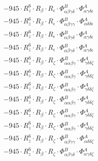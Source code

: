 \documentclass{article}
\begin{document}
\begin{subequations}
\begin{gather}
\begin{array}{c}
 \\[0.2em] 		 - 945 \cdot R_{z}^{6} \cdot R_{\beta{}} \cdot R_{\epsilon{}} \cdot \Phi{}^{B}_{\alpha{}\beta{}\gamma{}\delta{}} \cdot \Phi{}^{A}_{\alpha{}\gamma{}\delta{}\epsilon{}} 
 \\[0.2em] 		 - 945 \cdot R_{z}^{6} \cdot R_{\beta{}} \cdot R_{\epsilon{}} \cdot \Phi{}^{B}_{\alpha{}\beta{}\gamma{}\gamma{}} \cdot \Phi{}^{A}_{\alpha{}\delta{}\delta{}\epsilon{}} 
 \\[0.2em] 		 - 945 \cdot R_{z}^{6} \cdot R_{\beta{}} \cdot R_{\epsilon{}} \cdot \Phi{}^{B}_{\alpha{}\beta{}\gamma{}\delta{}} \cdot \Phi{}^{A}_{\alpha{}\gamma{}\delta{}\epsilon{}} 
 \\[0.2em] 		 - 945 \cdot R_{z}^{6} \cdot R_{\beta{}} \cdot R_{\epsilon{}} \cdot \Phi{}^{B}_{\alpha{}\beta{}\gamma{}\delta{}} \cdot \Phi{}^{A}_{\alpha{}\gamma{}\delta{}\epsilon{}} 
 \\[0.2em] 		 - 945 \cdot R_{z}^{6} \cdot R_{\beta{}} \cdot R_{\zeta{}} \cdot \Phi{}^{B}_{\alpha{}\alpha{}\beta{}\gamma{}} \cdot \Phi{}^{A}_{\gamma{}\delta{}\delta{}\zeta{}} 
 \\[0.2em] 		 - 945 \cdot R_{z}^{6} \cdot R_{\beta{}} \cdot R_{\zeta{}} \cdot \Phi{}^{B}_{\alpha{}\alpha{}\beta{}\gamma{}} \cdot \Phi{}^{A}_{\gamma{}\delta{}\delta{}\zeta{}} 
 \\[0.2em] 		 - 945 \cdot R_{z}^{6} \cdot R_{\beta{}} \cdot R_{\zeta{}} \cdot \Phi{}^{B}_{\alpha{}\alpha{}\beta{}\gamma{}} \cdot \Phi{}^{A}_{\gamma{}\delta{}\delta{}\zeta{}} 
 \\[0.2em] 		 - 945 \cdot R_{z}^{6} \cdot R_{\beta{}} \cdot R_{\zeta{}} \cdot \Phi{}^{B}_{\alpha{}\alpha{}\beta{}\gamma{}} \cdot \Phi{}^{A}_{\gamma{}\delta{}\delta{}\zeta{}} 
 \\[0.2em] 		 - 945 \cdot R_{z}^{6} \cdot R_{\beta{}} \cdot R_{\zeta{}} \cdot \Phi{}^{B}_{\alpha{}\alpha{}\beta{}\gamma{}} \cdot \Phi{}^{A}_{\gamma{}\delta{}\delta{}\zeta{}} 
 \\[0.2em] 		 - 945 \cdot R_{z}^{6} \cdot R_{\beta{}} \cdot R_{\zeta{}} \cdot \Phi{}^{B}_{\alpha{}\alpha{}\beta{}\gamma{}} \cdot \Phi{}^{A}_{\gamma{}\delta{}\delta{}\zeta{}} 
 \\[0.2em] 		 - 945 \cdot R_{z}^{6} \cdot R_{\beta{}} \cdot R_{\zeta{}} \cdot \Phi{}^{B}_{\alpha{}\beta{}\gamma{}\gamma{}} \cdot \Phi{}^{A}_{\alpha{}\delta{}\delta{}\zeta{}} 
 \\[0.2em] 		 - 945 \cdot R_{z}^{6} \cdot R_{\beta{}} \cdot R_{\zeta{}} \cdot \Phi{}^{B}_{\alpha{}\beta{}\gamma{}\delta{}} \cdot \Phi{}^{A}_{\alpha{}\gamma{}\delta{}\zeta{}} 

\end{array}
\end{gather}
\end{subequations}
\end{document}

